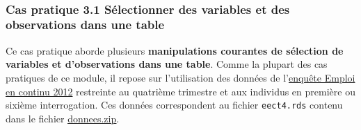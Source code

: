 \documentclass[12pt,twosided, notitlepage]{book}
\begin{document}
~

\subsubsection{\texorpdfstring{\textbf{Cas pratique 3.1} Sélectionner
des variables et des observations dans une
table}{Cas pratique 3.1 Sélectionner des variables et des observations dans une table}}\label{cas-pratique-3.1-selectionner-des-variables-et-des-observations-dans-une-table}


Ce cas pratique aborde plusieurs \textbf{manipulations courantes de
sélection de variables et d'observations dans une table}. Comme la
plupart des cas pratiques de ce module, il repose sur l'utilisation des
données de
l'\href{https://www.insee.fr/fr/metadonnees/source/s1223}{enquête Emploi
en continu 2012} restreinte au quatrième trimestre et aux individus en
première ou sixième interrogation. Ces données correspondent au fichier
\texttt{eect4.rds} contenu dans le fichier
\href{http://r.slmc.fr/donnees.zip}{\underline{donnees.zip}}.
\end{document}
